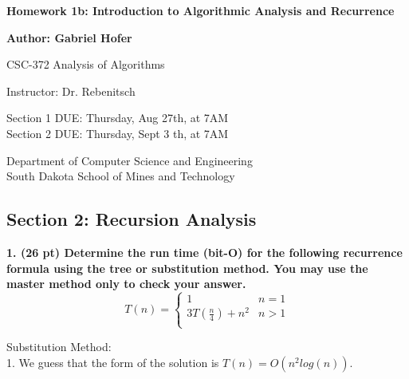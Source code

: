\documentclass[12pt, a4paper]{article}
\begin{document}
\begin{titlepage}
   \begin{center}
       \vspace*{1cm}
       \large
       \textbf{Homework 1b: Introduction to Algorithmic Analysis and Recurrence}
       \normalsize

       \vspace{0.5cm}

       \textbf{Author: Gabriel Hofer}

       \vspace{0.5cm}

       CSC-372 Analysis of Algorithms

       \vspace{0.5cm}

       Instructor: Dr. Rebenitsch

       \vspace{0.5cm}

       Section 1 DUE: Thursday, Aug 27th, at 7AM \\ 
       Section 2 DUE: Thursday, Sept 3 th, at 7AM  

       \vfill

       Department of Computer Science and Engineering\\
       South Dakota School of Mines and Technology\\

   \end{center}
\end{titlepage}
\newpage
\subsection*{Section 2: Recursion Analysis}

\textbf{1. (26 pt) Determine the run time (bit-O) for the following recurrence formula using the tree or substitution method.
You may use the master method only to check your answer. } \\ 

\[
  T(n) =  
  \begin{cases}
    1 & n = 1  \\
    3T(\frac{n}{4}) + n^2 & n > 1  \\
  \end{cases}
\]

Substitution Method: \\ 

1. We guess that the form of the solution is $ T(n) = O(n^2 log(n)) $.
\end{document}
